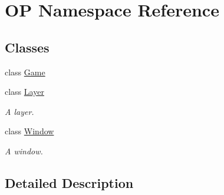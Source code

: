 \hypertarget{namespace_o_p}{}\section{OP Namespace Reference}
\label{namespace_o_p}
\subsection*{Classes}
\begin{DoxyCompactItemize}
\item 
class \mbox{\hyperlink{class_o_p_1_1_game}{Game}}
\item 
class \mbox{\hyperlink{class_o_p_1_1_layer}{Layer}}
\begin{DoxyCompactList}\small\item\em A layer. \end{DoxyCompactList}\item 
class \mbox{\hyperlink{class_o_p_1_1_window}{Window}}
\begin{DoxyCompactList}\small\item\em A window. \end{DoxyCompactList}\end{DoxyCompactItemize}


\subsection{Detailed Description}
